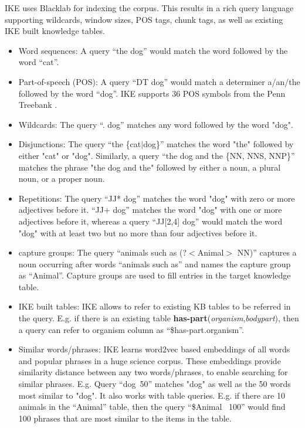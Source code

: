 \documentclass[11pt,letterpaper]{article}
\newcommand{\pred}{\bf}
\begin{document}
IKE uses Blacklab for indexing the corpus. This results in a rich query language supporting wildcards, window sizes, POS tags, chunk tags, as well as existing IKE built knowledge tables.
\begin{itemize}[noitemsep]
    \item Word sequences: A query ``the dog'' would match the word followed by the word ``cat''. 
    \item Part-of-speech (POS): A query ``DT dog'' would match a determiner a/an/the followed by the word ``dog''. IKE supports 36 POS symbols from the Penn Treebank \cite{Marcus1993BuildingAL}.
    \item Wildcards: The query ``. dog'' matches any word followed by the word "dog".
    \item Disjunctions: The query ``the \{cat$|$dog\}'' matches the word "the" followed by either "cat" or "dog". Similarly, a query ``the dog and the \{NN, NNS, NNP\}'' matches the phrase "the dog and the" followed by either a noun, a plural noun, or a proper noun.
    \item Repetitions: The query ``JJ* dog'' matches the word "dog" with zero or more adjectives before it. ``JJ+ dog'' matches the word "dog" with one or more adjectives before it, whereas a query ``JJ[2,4] dog'' would match the word "dog" with at least two but no more than four adjectives before it.
    \item capture groups: The query ``animals such as (?$<$Animal$>$ NN)'' captures a noun occurring after words ``animals such as'' and names the capture group as ``Animal''. Capture groups are used to fill entries in the target knowledge table.
    \item IKE built tables: IKE allows to refer to existing KB tables to be referred in the query. E.g. if there is an existing table {\pred has-part}({\it organism},{\it bodypart}), then a query can refer to organism column as ``\$has-part.organism''. 
    \item Similar words/phrases: IKE learns word2vec based embeddings of all words and popular phrases in a huge science corpus. These embeddings provide similarity distance between any two words/phrases, to enable searching for similar phrases. E.g. Query ``dog~50''	matches "dog" as well as the 50 words most similar to "dog". It also works with table queries. E.g. if there are 10 animals in the ``Animal'' table, then the query ``\$Animal ~100'' would find 100 phrases that are most similar to the items in the table.
\end{itemize}
    
\end{document}
